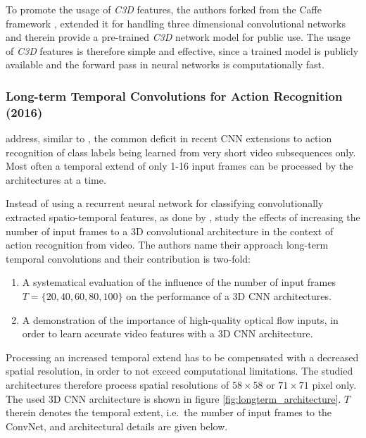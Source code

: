 To promote the usage of \textit{C3D} features, the authors forked from the Caffe framework \cite{jia_caffe:_2014}, extended it for handling three dimensional convolutional networks and therein provide a pre-trained \textit{C3D} network model for public use.
The usage of \textit{C3D} features is therefore simple and effective, since a trained model is publicly available and the forward pass in neural networks is computationally fast.


\subsubsection{Long-term Temporal Convolutions for Action Recognition (2016)}
\textcite{varol_long-term_2016} address, similar to \textcite{baccouche_sequential_2011}, the common deficit in recent CNN extensions to action recognition of class labels being learned from very short video subsequences only.
Most often a temporal extend of only 1-16 input frames can be processed by the architectures at a time. \cite{ji_3d_2013}\cite{karpathy_large-scale_2014}\cite{tran_learning_2015}

Instead of using a recurrent neural network for classifying convolutionally extracted spatio-temporal features, as done by \textcite{baccouche_sequential_2011}, \textcite{varol_long-term_2016} study the effects of increasing the number of input frames to a 3D convolutional architecture in the context of action recognition from video.
The authors name their approach long-term temporal convolutions and their contribution is two-fold:
\begin{enumerate}
    \item A systematical evaluation of the influence of the number of input frames $T = \{20, 40, 60, 80, 100\}$ on the performance of a 3D CNN architectures.  
    \item A demonstration of the importance of high-quality optical flow inputs, in order to learn accurate video features with a 3D CNN architecture.
\end{enumerate}

Processing an increased temporal extend has to be compensated with a decreased spatial resolution, in order to not exceed computational limitations.
The studied architectures therefore process spatial resolutions of $58\times58$ or $71\times71$ pixel only.
The used 3D CNN architecture is shown in figure \ref{fig:longterm_architecture}.
$T$ therein denotes the temporal extent, i.e.\ the number of input frames to the ConvNet, and architectural details are given below.

